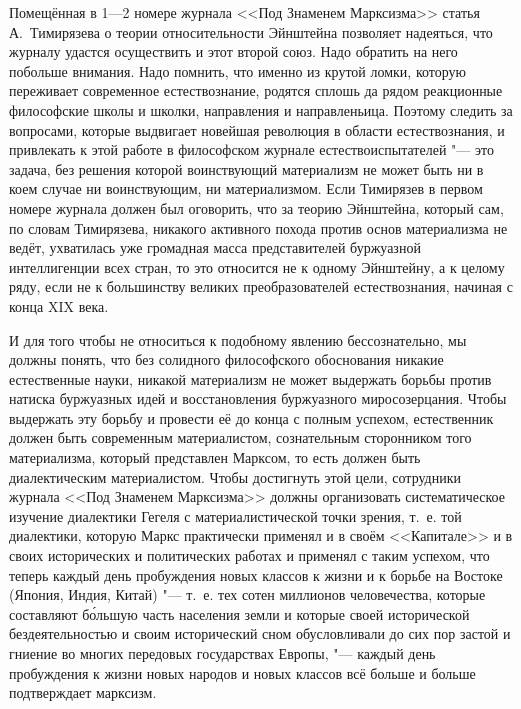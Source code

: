 Помещённая в 1---2 номере журнала <<Под Знаменем Марксизма>> статья
А.~Тимирязева о теории относительности Эйнштейна позволяет
надеяться, что журналу удастся осуществить и этот второй союз. Надо
обратить на него побольше внимания. Надо помнить, что именно из крутой
ломки, которую переживает современное естествознание, родятся сплошь да
рядом реакционные философские школы и школки, направления и направленьица.
Поэтому следить за вопросами, которые выдвигает новейшая революция в
области естествознания, и привлекать к этой работе в философском журнале
естествоиспытателей "--- это задача, без решения которой воинствующий
материализм не может быть ни в коем случае ни воинствующим, ни
материализмом. Если Тимирязев в первом номере журнала должен был оговорить,
что за теорию Эйнштейна, который сам, по словам Тимирязева, никакого
активного похода против основ материализма не ведёт, ухватилась уже
громадная масса представителей буржуазной интеллигенции всех стран, то это
относится не к одному Эйнштейну, а к целому ряду, если не к большинству
великих преобразователей естествознания, начиная с конца XIX века.

И для того чтобы не относиться к подобному явлению бессознательно, мы
должны понять, что без солидного философского обоснования никакие
естественные науки, никакой материализм не может выдержать борьбы против
натиска буржуазных идей и восстановления буржуазного миросозерцания. Чтобы
выдержать эту борьбу и провести её до конца с полным успехом, естественник
должен быть современным материалистом, сознательным сторонником того
материализма, который представлен Марксом, то есть должен быть
диалектическим материалистом. Чтобы достигнуть этой цели, сотрудники
журнала <<Под Знаменем Марксизма>> должны организовать систематическое
изучение диалектики Гегеля с материалистической точки зрения, т.~е. той
диалектики, которую Маркс практически применял и в своём <<Капитале>> и в
своих исторических и политических работах и применял с таким успехом, что
теперь каждый день пробуждения новых классов к жизни и к борьбе на Востоке
(Япония, Индия, Китай) "--- т.~е. тех сотен миллионов человечества, которые
составляют б\'{о}льшую часть населения земли и которые своей исторической
бездеятельностью и своим исторический сном обусловливали до сих пор застой
и гниение во многих передовых государствах Европы, "--- каждый день
пробуждения к жизни новых народов и новых классов всё больше и больше
подтверждает марксизм.

